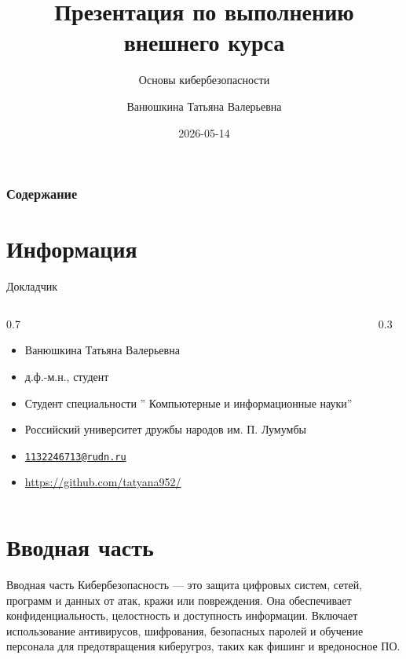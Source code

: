 \documentclass[
  ignorenonframetext,
  aspectratio=169,
]{beamer}
\title{Презентация по выполнению внешнего курса}
\subtitle{Основы кибербезопасности}
\author{Ванюшкина Татьяна Валерьевна}
\date{2026-05-14}
\providecommand{\tightlist}{%
  \setlength{\itemsep}{0pt}\setlength{\parskip}{0pt}}\usepackage{longtable,booktabs,array}
\renewcommand*\contentsname{Содержание}
\newcommand\contentsname{Содержание}
\begin{document}
\frame{\titlepage}

\renewcommand*\contentsname{Содержание}
\begin{frame}[allowframebreaks]
  \frametitle{Содержание}
  \tableofcontents[hideallsubsections]
\end{frame}

\section{Информация}\label{ux438ux43dux444ux43eux440ux43cux430ux446ux438ux44f}

\begin{frame}{Докладчик}
\label{ux434ux43eux43aux43bux430ux434ux447ux438ux43a}
\begin{columns}[c]
\begin{column}{0.7\textwidth}
\begin{itemize}[<+->]
\tightlist
\item
  Ванюшкина Татьяна Валерьевна
\item
  д.ф.-м.н., студент
\item
  Студент специальности '' Компьютерные и информационные науки''
\item
  Российский университет дружбы народов им. П. Лумумбы
\item
  \href{mailto:1132246713@rudn.ru}{\nolinkurl{1132246713@rudn.ru}}
\item
  \url{https://github.com/tatyana952/}
\end{itemize}
\end{column}

\begin{column}{0.3\textwidth}
\end{column}
\end{columns}
\end{frame}

\section{Вводная
часть}\label{ux432ux432ux43eux434ux43dux430ux44f-ux447ux430ux441ux442ux44c}

\begin{frame}{Вводная часть}
Кибербезопасность --- это защита цифровых систем, сетей, программ и
данных от атак, кражи или повреждения. Она обеспечивает
конфиденциальность, целостность и доступность информации. Включает
использование антивирусов, шифрования, безопасных паролей и обучение
персонала для предотвращения киберугроз, таких как фишинг и вредоносное
ПО.
\end{frame}
\end{document}
